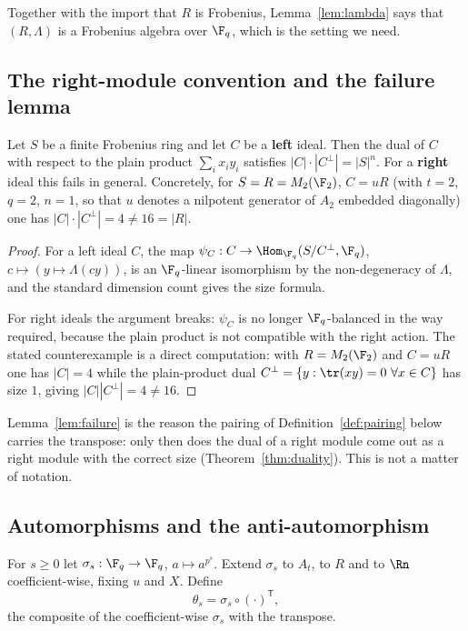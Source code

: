 Together with the import that $R$ is Frobenius, Lemma~\ref{lem:lambda} says that
$(R,\Lambda)$ is a Frobenius algebra over $\F_q$, which is the setting we need.

\subsection{The right-module convention and the failure lemma}

\begin{lemma}\label{lem:failure}
Let $S$ be a finite Frobenius ring and let
$C$ be a \textbf{left} ideal. Then the dual of $C$ with respect to the plain
product $\sum_ix_iy_i$ satisfies $|C|\cdot|C^{\perp}|=|S|^n$. For a
\textbf{right} ideal this fails in general. Concretely, for
$S=R=M_2(\F_2)$, $C=uR$ (with $t=2$, $q=2$, $n=1$, so that $u$ denotes a
nilpotent generator of $A_2$ embedded diagonally) one has
$|C|\cdot|C^{\perp}|=4\ne16=|R|$.
\end{lemma}

\begin{proof}
For a left ideal $C$, the map
$\psi_C:C\to\Hom_{\F_q}(S/C^{\perp},\F_q)$, $c\mapsto(y\mapsto\Lambda(cy))$, is
an $\F_q$-linear isomorphism by the non-degeneracy of $\Lambda$, and the
standard dimension count gives the size formula.

For right ideals the argument breaks: $\psi_C$ is no longer $\F_q$-balanced in
the way required, because the plain product is not compatible with the
right action. The stated counterexample is a direct computation: with
$R=M_2(\F_2)$ and $C=uR$ one has $|C|=4$ while the plain-product dual
$C^{\perp}=\{y:\tr(xy)=0\ \forall x\in C\}$ has size $1$, giving
$|C||C^{\perp}|=4\ne 16$.
\end{proof}

\begin{remark}\label{rem:convention}
Lemma~\ref{lem:failure} is the reason the pairing of
Definition~\ref{def:pairing} below carries the transpose: only then does the
dual of a right module come out as a right module with the correct size
(Theorem~\ref{thm:duality}). This is not a matter of notation.
\end{remark}

\subsection{Automorphisms and the anti-automorphism}

\begin{definition}\label{def:sigma}
For $s\ge0$ let $\sigma_s:\F_q\to\F_q$, $a\mapsto a^{p^s}$. Extend $\sigma_s$
to $A_t$, to $R$ and to $\Rn$ coefficient-wise, fixing $u$ and $X$. Define
\begin{equation}\label{eq:theta}
  \theta_s=\sigma_s\circ(\cdot)^{\mathsf T},
\end{equation}
the composite of the coefficient-wise $\sigma_s$ with the transpose.
\end{definition}

